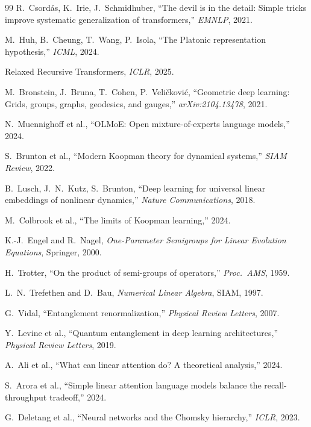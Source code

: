 \documentclass[11pt, a4paper]{article}
\theoremstyle{plain}
\theoremstyle{definition}
\theoremstyle{remark}
\begin{document}
\begin{thebibliography}{99}
R.~Csord\'{a}s, K.~Irie, J.~Schmidhuber,
``The devil is in the detail: Simple tricks improve systematic generalization of transformers,''
\emph{EMNLP}, 2021.

M.~Huh, B.~Cheung, T.~Wang, P.~Isola,
``The Platonic representation hypothesis,''
\emph{ICML}, 2024.

Relaxed Recursive Transformers,
\emph{ICLR}, 2025.

M.~Bronstein, J.~Bruna, T.~Cohen, P.~Veli\v{c}kovi\'{c},
``Geometric deep learning: Grids, groups, graphs, geodesics, and gauges,''
\emph{arXiv:2104.13478}, 2021.

N.~Muennighoff et al.,
``OLMoE: Open mixture-of-experts language models,''
2024.

S.~Brunton et al.,
``Modern Koopman theory for dynamical systems,''
\emph{SIAM Review}, 2022.

B.~Lusch, J.~N.~Kutz, S.~Brunton,
``Deep learning for universal linear embeddings of nonlinear dynamics,''
\emph{Nature Communications}, 2018.

M.~Colbrook et al.,
``The limits of Koopman learning,''
2024.

K.-J.~Engel and R.~Nagel,
\emph{One-Parameter Semigroups for Linear Evolution Equations},
Springer, 2000.

H.~Trotter,
``On the product of semi-groups of operators,''
\emph{Proc.\ AMS}, 1959.

L.~N.~Trefethen and D.~Bau,
\emph{Numerical Linear Algebra},
SIAM, 1997.

G.~Vidal,
``Entanglement renormalization,''
\emph{Physical Review Letters}, 2007.

Y.~Levine et al.,
``Quantum entanglement in deep learning architectures,''
\emph{Physical Review Letters}, 2019.

A.~Ali et al.,
``What can linear attention do? A theoretical analysis,''
2024.

S.~Arora et al.,
``Simple linear attention language models balance the recall-throughput tradeoff,''
2024.

G.~Deletang et al.,
``Neural networks and the Chomsky hierarchy,''
\emph{ICLR}, 2023.


\end{thebibliography}
\end{document}
